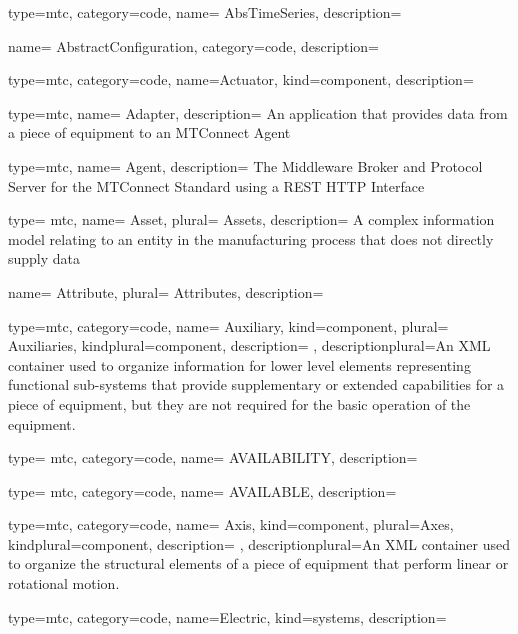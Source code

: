 

{
  type=mtc,
  category=code,
  name= {AbsTimeSeries},
  description= {}
}


{
  name= {AbstractConfiguration},
  category=code,
  description= {}
}


{
  type=mtc,
  category=code,
  name={Actuator},
  kind={component},
  description={}
}


{
  type=mtc,
  name= {Adapter},
  description= {An application that provides data from a piece of equipment to an MTConnect Agent}
}


{
  type=mtc,
  name= {Agent},
  description= {The Middleware Broker and Protocol Server for the MTConnect Standard using a REST HTTP Interface}
}


{
  type= mtc,
  name= {Asset},
  plural= {Assets},
  description= {A complex information model relating to an entity in the manufacturing process that does not directly supply data}
}


{
  name= {Attribute},
  plural= {Attributes},
  description= {}
}


{
  type=mtc,
  category=code,
  name= {Auxiliary},
  kind={component},
  plural= {Auxiliaries},
  kindplural={component},
  description= {},
  descriptionplural={An XML container used to organize information for \gls{lower level} elements representing functional sub-systems that provide supplementary or extended capabilities for a piece of equipment, but they are not required for the basic operation of the equipment.}
}


{
  type= mtc,
  category=code,
  name= {AVAILABILITY},
  description= {}
}


{
  type= mtc,
  category=code,
  name= {AVAILABLE},
  description= {}
}


{
  type=mtc,
  category=code,
  name= {Axis},
  kind={component},
  plural={Axes},
  kindplural={component},
  description= {},
  descriptionplural={An XML container used to organize the \glspl{structural element} of a piece of equipment that perform linear or rotational motion.}
}


{
  type=mtc,
  category=code,
  name={Electric},
  kind={systems},
  description={}
}



